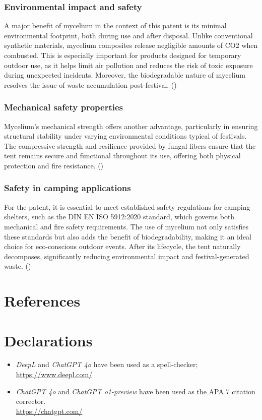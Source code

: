 \documentclass{article}
\begin{document}
\subsubsection{Environmental impact and safety}

A major benefit of mycelium in the context of this patent is its minimal environmental
footprint, both during use and after disposal. Unlike conventional synthetic materials,
mycelium composites release negligible amounts of CO2 when combusted. This is especially
important for products designed for temporary outdoor use, as it helps limit air pollution
and reduces the risk of toxic exposure during unexpected incidents. Moreover, the
biodegradable nature of mycelium resolves the issue of waste accumulation post-festival.
(\cite{myc-environment})

\subsubsection{Mechanical safety properties}

Mycelium’s mechanical strength offers another advantage, particularly in ensuring
structural stability under varying environmental conditions typical of festivals. The
compressive strength and resilience provided by fungal fibers ensure that the tent remains
secure and functional throughout its use, offering both physical protection and fire
resistance. (\cite{myc-mechanical})

\subsubsection{Safety in camping applications}

For the patent, it is essential to meet established safety regulations for camping
shelters, such as the DIN EN ISO 5912:2020 standard, which governs both mechanical and
fire safety requirements. The use of mycelium not only satisfies these standards but also
adds the benefit of biodegradability, making it an ideal choice for eco-conscious outdoor
events. After its lifecycle, the tent naturally decomposes, significantly reducing
environmental impact and festival-generated waste. (\cite{tent-safety})

\newpage
\section{References}
\setlength{\bibitemsep}{1.2\baselineskip}
\printbibliography[heading=none]
\vfill

\section{Declarations}
\begin{itemize}
    \item \textit{DeepL} and \textit{ChatGPT 4o} have been used as a spell-checker;\\
        \url{https://www.deepl.com/}
    \item \textit{ChatGPT 4o} and \textit{ChatGPT o1-preview} have been used as the APA 7 citation corrector.\\
        \url{https://chatgpt.com/}
\end{itemize}
\end{document}
